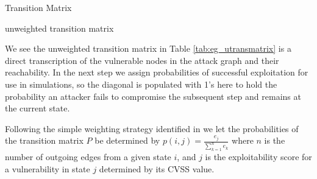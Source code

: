 \begin{table}[ht]
\caption{Transition Matrix}
\begin{subtable}[t]{0.5\textwidth}
\caption{unweighted transition matrix}
\label{tab:eg_utransmatrix}
\end{subtable}
\begin{subtable}[t]{0.5\textwidth}
\flushleft
{}
\caption{weighted transition matrix $P$}
\label{tab:wt_transmatrix}
\end{subtable}
\label{fig:eg_tmatrix}
\end{table}


We see the unweighted transition matrix in Table \ref{tab:eg_utransmatrix} is a direct transcription of the vulnerable nodes in the attack graph and their reachability. In the next step we assign probabilities of successful exploitation for use in simulations, so the diagonal is populated with 1's here to hold the probability an attacker fails to compromise the subsequent step and remains at the current state.

Following the simple weighting strategy identified in \cite{Abraham_2016} we let the probabilities of the transition matrix $P$ be determined by $p(i,j)= \frac{e_j}{\sum_{k=1}^{n}e_k}$ where $n$ is the number of outgoing edges from a given state $i$, and $j$ is the exploitability score for a vulnerability in state $j$ determined by its CVSS value. 

